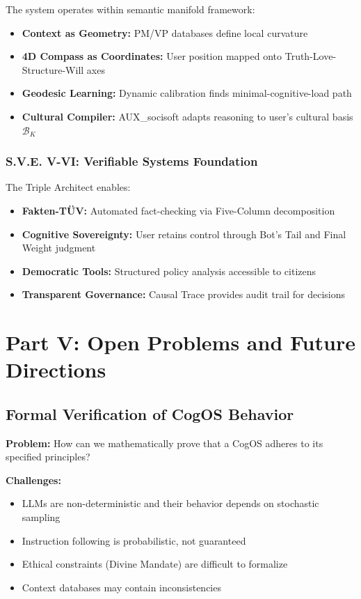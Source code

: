 \documentclass[11pt,a4paper]{article}
\theoremstyle{definition}
\theoremstyle{remark}
\begin{document}
The system operates within semantic manifold framework:
\begin{itemize}
    \item \textbf{Context as Geometry:} PM/VP databases define local curvature
    \item \textbf{4D Compass as Coordinates:} User position mapped onto Truth-Love-Structure-Will axes
    \item \textbf{Geodesic Learning:} Dynamic calibration finds minimal-cognitive-load path
    \item \textbf{Cultural Compiler:} AUX\_socisoft adapts reasoning to user's cultural basis $\mathcal{B}_K$
\end{itemize}

\subsubsection{S.V.E. V-VI: Verifiable Systems Foundation}

The Triple Architect enables:
\begin{itemize}
    \item \textbf{Fakten-TÜV:} Automated fact-checking via Five-Column decomposition
    \item \textbf{Cognitive Sovereignty:} User retains control through Bot's Tail and Final Weight judgment
    \item \textbf{Democratic Tools:} Structured policy analysis accessible to citizens
    \item \textbf{Transparent Governance:} Causal Trace provides audit trail for decisions
\end{itemize}

\section{Part V: Open Problems and Future Directions}

\subsection{Formal Verification of CogOS Behavior}

\textbf{Problem:} How can we mathematically prove that a CogOS adheres to its specified principles?

\textbf{Challenges:}
\begin{itemize}
    \item LLMs are non-deterministic and their behavior depends on stochastic sampling
    \item Instruction following is probabilistic, not guaranteed
    \item Ethical constraints (Divine Mandate) are difficult to formalize
    \item Context databases may contain inconsistencies
\end{itemize}
\end{document}
